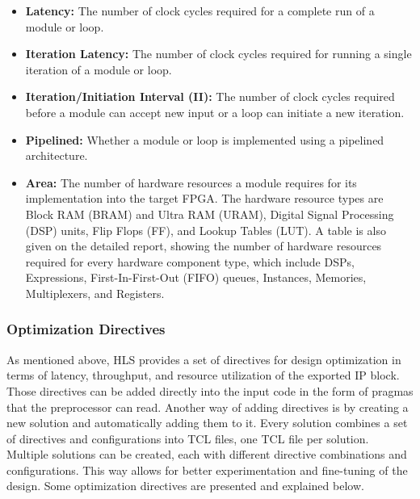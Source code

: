 \begin{itemize}
	\item \textbf{Latency:} The number of clock cycles required for a complete run of a module or loop.
	\item \textbf{Iteration Latency:} The number of clock cycles required for running a single iteration of a module or loop.
	\item \textbf{Iteration/Initiation Interval (II):} The number of clock cycles required before a module can accept new input or a loop can initiate a new iteration.
	\item \textbf{Pipelined:} Whether a module or loop is implemented using a pipelined architecture.
	\item \textbf{Area:} The number of hardware resources a module requires for its implementation into the target FPGA. The hardware resource types are Block RAM (BRAM) and Ultra RAM (URAM), Digital Signal Processing (DSP) units, Flip Flops (FF), and Lookup Tables (LUT). A table is also given on the detailed report, showing the number of hardware resources required for every hardware component type, which include DSPs, Expressions, First-In-First-Out (FIFO) queues, Instances, Memories, Multiplexers, and Registers.
\end{itemize}

\subsubsection{Optimization Directives}
As mentioned above, HLS provides a set of directives for design optimization in terms of latency, throughput, and resource utilization of the exported IP block. Those directives can be added directly into the input code in the form of pragmas that the preprocessor can read. Another way of adding directives is by creating a new solution and automatically adding them to it. Every solution combines a set of directives and configurations into TCL files, one TCL file per solution. Multiple solutions can be created, each with different directive combinations and configurations. This way allows for better experimentation and fine-tuning of the design. Some optimization directives are presented and explained below.

